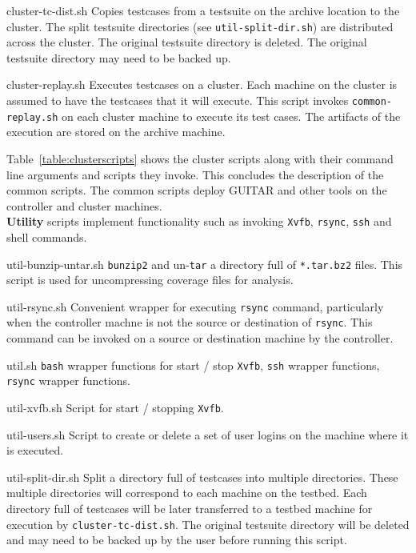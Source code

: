 \begin{smalldescription}
   \item [cluster-tc-dist.sh] Copies testcases from a testsuite on the archive location to the cluster. The split testsuite directories (see \texttt{util-split-dir.sh}) are distributed across the cluster. The original testsuite directory is deleted. The original testsuite directory may need to be backed up.

   \item [cluster-replay.sh] Executes testcases on a cluster. Each machine on the cluster is assumed to have the testcases that it will execute. This script invokes \texttt{common-replay.sh} on each cluster machine to execute its test cases. The artifacts of the execution are stored on the archive machine.\\

\end{smalldescription}

Table~\ref{table:clusterscripts} shows the cluster scripts along with their command line arguments and scripts they invoke. This concludes the description of the common scripts. The common scripts deploy GUITAR and other tools on the controller and cluster machines. \\


\noindent \textbf{Utility} scripts implement functionality such as invoking \texttt{Xvfb}, \texttt{rsync}, \texttt{ssh} and shell commands.\\

\begin{smalldescription}
   \item [util-bunzip-untar.sh] \texttt{bunzip2} and un-\texttt{tar} a directory full of \texttt{*.tar.bz2} files. This script is used for uncompressing coverage files for analysis.

   \item [util-rsync.sh] Convenient wrapper for executing \texttt{rsync} command, particularly when the controller machne is not the source or destination of \texttt{rsync}. This command can be invoked on a source or destination machine by the controller.

   \item [util.sh] \texttt{bash} wrapper functions for start / stop \texttt{Xvfb}, \texttt{ssh} wrapper functions, \texttt{rsync} wrapper functions.

   \item [util-xvfb.sh] Script for start / stopping \texttt{Xvfb}.

   \item [util-users.sh] Script to create or delete a set of user logins on the machine where it is executed.

   \item [util-split-dir.sh] Split a directory full of testcases into multiple directories. These multiple directories will correspond to each machine on the testbed. Each directory full of testcases will be later transferred to a testbed machine for execution by \texttt{cluster-tc-dist.sh}. The original testsuite directory will be deleted and may need to be backed up by the user before running this script.
\end{smalldescription}


